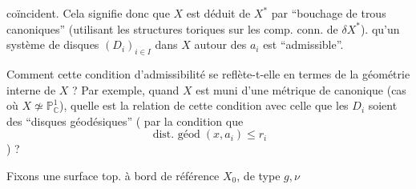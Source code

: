 coïncident. Cela signifie donc que
$X$ est déduit de $X^*$ par ``bouchage
de trous  canoniques'' (utilisant
les structures toriques sur les
comp. conn. de $\delta X^*$). 
qu'un système de disques $(D_i)_{i\in I}$ dans $X$
 autour des $a_i$ est ``admissible''.

\uline{} Comment cette condition
d'admissibilité se reflète-t-elle en
termes de la géométrie interne de $X$ ?
Par exemple,  quand $X$ est muni
d'une métrique de  canonique
(cas où $X\not\simeq\mathbb P^1_{\mathbb C}$), quelle est la
relation de cette condition avec celle
que les \deleted{$\unsure{\delta}$}$D_i$ soient des ``disques
géodésiques'' ( par la condition que
\[
\operatorname{\text{dist. géod}}(x,a_i)\leq r_i
\]
) ?

Fixons une  surface top. 
à bord de référence $X_0$, de type $g,\nu$
